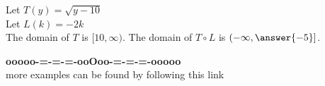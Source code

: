 \documentclass{ximera}
\begin{document}
\begin{question}


Let $T(y) = \sqrt{y-10}$ \\

Let $L(k) = -2k$ \\


The domain of $T$ is $[10, \infty)$.  The domain of $T \circ L$ is $\left( -\infty, \answer{-5} \right]$.


\end{question}
















\begin{center}
\textbf{\textcolor{green!50!black}{ooooo-=-=-=-ooOoo-=-=-=-ooooo}} \\

more examples can be found by following this link\\ 

\end{center}
\end{document}
